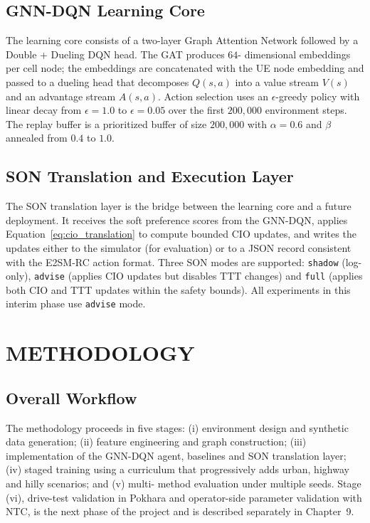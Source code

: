\documentclass[12pt,a4paper,oneside]{report}
\begin{document}
\section{GNN-DQN Learning Core}

The learning core consists of a two-layer Graph Attention Network
followed by a Double + Dueling DQN head. The GAT produces $64$-
dimensional embeddings per cell node; the embeddings are concatenated
with the UE node embedding and passed to a dueling head that decomposes
$Q(s,a)$ into a value stream $V(s)$ and an advantage stream $A(s,a)$.
Action selection uses an $\epsilon$-greedy policy with linear decay from
$\epsilon = 1.0$ to $\epsilon = 0.05$ over the first $200{,}000$
environment steps. The replay buffer is a prioritized buffer of size
$200{,}000$ with $\alpha = 0.6$ and $\beta$ annealed from $0.4$ to $1.0$.

\section{SON Translation and Execution Layer}

The SON translation layer is the bridge between the learning core and a
future deployment. It receives the soft preference scores from the
GNN-DQN, applies Equation~\eqref{eq:cio_translation} to compute bounded
CIO updates, and writes the updates either to the simulator (for
evaluation) or to a JSON record consistent with the E2SM-RC action
format. Three SON modes are supported: \texttt{shadow} (log-only),
\texttt{advise} (applies CIO updates but disables TTT changes) and
\texttt{full} (applies both CIO and TTT updates within the safety
bounds). All experiments in this interim phase use \texttt{advise} mode.

\chapter{METHODOLOGY}

\section{Overall Workflow}

The methodology proceeds in five stages: (i) environment design and
synthetic data generation; (ii) feature engineering and graph
construction; (iii) implementation of the GNN-DQN agent, baselines and
SON translation layer; (iv) staged training using a curriculum that
progressively adds urban, highway and hilly scenarios; and (v) multi-
method evaluation under multiple seeds. Stage (vi), drive-test
validation in Pokhara and operator-side parameter validation with NTC,
is the next phase of the project and is described separately in
Chapter~9.
\end{document}
